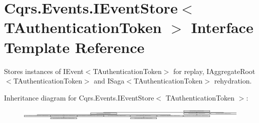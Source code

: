 \hypertarget{interfaceCqrs_1_1Events_1_1IEventStore}{}\section{Cqrs.\+Events.\+I\+Event\+Store$<$ T\+Authentication\+Token $>$ Interface Template Reference}
\label{interfaceCqrs_1_1Events_1_1IEventStore}


Stores instances of I\+Event$<$\+T\+Authentication\+Token$>$ for replay, I\+Aggregate\+Root$<$\+T\+Authentication\+Token$>$ and I\+Saga$<$\+T\+Authentication\+Token$>$ rehydration.  


Inheritance diagram for Cqrs.\+Events.\+I\+Event\+Store$<$ T\+Authentication\+Token $>$\+:\begin{figure}[H]
\begin{center}
\leavevmode
\includegraphics[height=0.539499cm]{interfaceCqrs_1_1Events_1_1IEventStore}
\end{center}
\end{figure}
